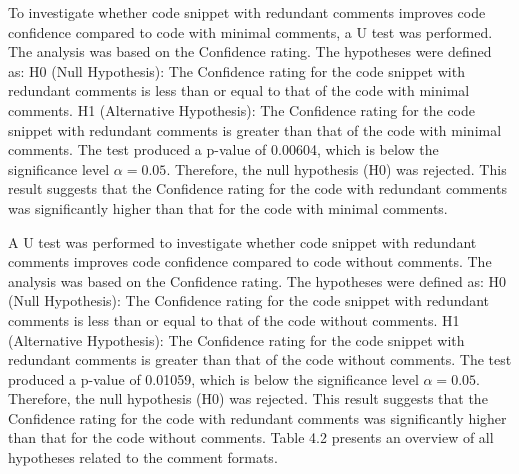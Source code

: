 To investigate whether code snippet with redundant comments improves code confidence compared to code with minimal comments, a U test was performed. The analysis was based on the Confidence rating. The hypotheses were defined as:  H0 (Null Hypothesis): The Confidence rating for the code snippet with redundant comments is less than or equal to that of the code with minimal comments.  H1 (Alternative Hypothesis): The Confidence rating for the code snippet with redundant comments is greater than that of the code with minimal comments.      
The test produced a p-value of  0.00604, which is below the significance level $\alpha = 0.05$. Therefore, the null hypothesis (H0) was rejected.  This result suggests that the Confidence rating  for the code with redundant comments was significantly higher than that for the code with minimal comments.   


A U test was performed to investigate whether code snippet with redundant comments improves code confidence compared to code without comments. The analysis was based on the Confidence rating. The hypotheses were defined as:  H0 (Null Hypothesis): The Confidence rating for the code snippet with redundant comments is less than or equal to that of the code without comments.  H1 (Alternative Hypothesis): The Confidence rating for the code snippet with redundant comments is greater than that of the code without comments.      
The test produced a p-value of  0.01059, which is below the significance level $\alpha = 0.05$. Therefore, the null hypothesis (H0) was rejected.  This result suggests that the Confidence rating  for the code with redundant comments was significantly higher than that for the code without comments.   Table 4.2 presents an overview of all hypotheses related to the comment formats.

